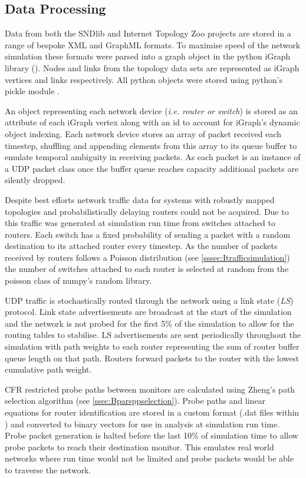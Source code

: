 \subsection{Data Processing}
\label{ssec:Mdataprocessing}
Data from both the SNDlib and Internet Topology Zoo projects are stored in a range of bespoke XML and GraphML formats. To maximise speed of the network simulation these formats were parsed into a graph object in the python iGraph library (\cite{csardi_igraph_2006}). Nodes and links from the topology data sets are represented as iGraph vertices and links respectively. All python objects were stored using python's pickle module \cite{van_rossum_python_2020}.\par
An object representing each network device (\textit{i.e. router or switch}) is stored as an attribute of each iGraph vertex along with an id to account for iGraph's dynamic object indexing. Each network device stores an array of packet received each timestep, shuffling and appending elements from this array to its queue buffer to emulate temporal ambiguity in receiving packets. As each packet is an instance of a UDP packet class once the buffer queue reaches capacity additional packets are silently dropped.\par
Despite best efforts network traffic data for systems with robustly mapped topologies and probabilistically delaying routers could not be acquired. Due to this traffic was generated at simulation run time from switches attached to routers. Each switch has a fixed probability of sending a packet with a random destination to its attached router every timestep. As the number of packets received by routers follows a Poisson distribution (see \cref{sssec:Itrafficsimulation}) the number of switches attached to each router is selected at random from the poisson class of numpy's random library.\par
UDP traffic is stochastically routed through the network using a link state (\textit{LS}) protocol. Link state advertisements are broadcast at the start of the simulation and the network is not probed for the first 5\% of the simulation to allow for the routing tables to stabilise. LS advertisements are sent periodically throughout the simulation with path weights to each router representing the sum of router buffer queue length on that path. Routers forward packets to the router with the lowest cumulative path weight.\par
CFR restricted probe paths between monitors are calculated using Zheng's path selection algorithm (see \cref{ssec:Bparsppselection}). Probe paths and linear equations for router identification are stored in a custom format (.dat files within \cite{sylvester_millar_real_2021}) and converted to binary vectors for use in analysis at simulation run time. Probe packet generation is halted before the last 10\% of simulation time to allow probe packets to reach their destination monitor. This emulates real world networks where run time would not be limited and probe packets would be able to traverse the network.\par
